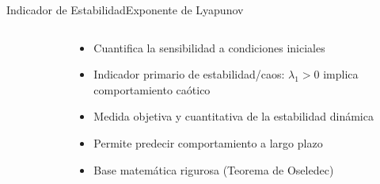 \begin{frame}{Indicador de Estabilidad}{Exponente de Lyapunov}
\begin{columns}
\begin{column}{0.4\textwidth}
\begin{figure}[H]
            \end{figure}
        \end{column}
        \begin{column}{0.6\textwidth}
            \begin{itemize}
                \item Cuantifica la sensibilidad a condiciones iniciales
                \item Indicador primario de estabilidad/caos: $\lambda_1 > 0$ implica comportamiento caótico
                \item Medida objetiva y cuantitativa de la estabilidad dinámica
                \item Permite predecir comportamiento a largo plazo
                \item Base matemática rigurosa (Teorema de Oseledec)
            \end{itemize}
        \end{column}
    \end{columns}
\end{frame}

